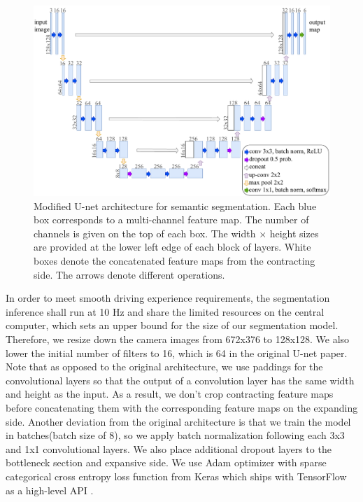 \begin{figure}[h]
  \centering
  \includegraphics[width=1.0\textwidth]{figures/unet-architecture.pdf}
  \caption[Modified U-net semantic segmentation architecture]{Modified U-net
    architecture for semantic segmentation. Each blue box corresponds to a
    multi-channel feature map. The number of channels is given on the top of
    each box. The width $\times$ height sizes are provided at the lower left
    edge of each block of layers. White boxes denote the concatenated feature
    maps from the contracting side. The arrows denote different operations.}
  \label{figure:unet-architecture}
\end{figure}

In order to meet smooth driving experience requirements, the segmentation
inference shall run at 10 Hz and share the limited resources on the central
computer, which sets an upper bound for the size of our segmentation model.
Therefore, we resize down the camera images from 672x376 to 128x128. We also
lower the initial number of filters to 16, which is 64 in the original U-net
paper. Note that as opposed to the original architecture, we use paddings for
the convolutional layers so that the output of a convolution layer has the same
width and height as the input. As a result, we don't crop contracting feature
maps before concatenating them with the corresponding feature maps on the
expanding side. Another deviation from the original architecture is that we
train the model in batches(batch size of 8), so we apply batch normalization
following each 3x3 and 1x1 convolutional layers. We also place additional
dropout layers to the bottleneck section and expansive side. We use Adam
optimizer with sparse categorical cross entropy loss function from Keras which
ships with TensorFlow as a high-level API \cite{Abadi2015TF, Chollet2015Keras}.

